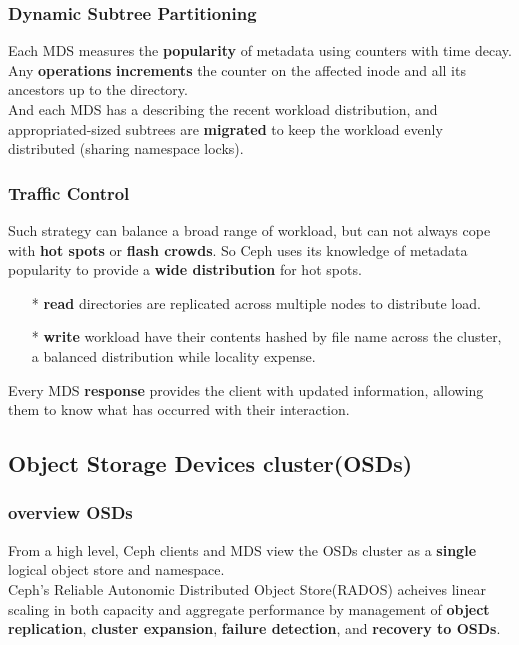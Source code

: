 \documentclass[cjk,slidestop,mathserif]{beamer}
\begin{document}
\begin{CJK}{UTF8}{gkai}
\begin{frame}
\end{frame}

\begin{frame}
 \frametitle{Dynamic Subtree Partitioning}
 \vspace{12pt}
 Each MDS measures the \textbf{popularity} of metadata using counters with time decay. Any \textbf{operations} 
 \textbf{increments} the counter on the affected inode and all its ancestors up to the directory. \\
 \vspace{6pt}
 And each MDS has a  describing the recent workload distribution, and appropriated-sized 
 subtrees are \textbf{migrated} to keep 
 the workload evenly distributed (sharing namespace locks).
\end{frame}

\begin{frame}
 \frametitle{Traffic Control}
 \vspace{6pt}
 Such strategy can balance a broad range of workload, but can not always cope with \textbf{hot spots} or \textbf{flash crowds}. 
 So Ceph uses its knowledge of metadata popularity to provide a \textbf{wide distribution} for hot spots.\\
 \vspace{4pt}
 \begin{itemize}
  \item[*] \textbf{read} directories are replicated across multiple nodes to distribute load.
  \item[*] \textbf{write} workload have their contents hashed by file name across the cluster, a balanced distribution while locality expense.
 \end{itemize}
  Every MDS \textbf{response} provides the client with updated information, allowing them to know what has occurred with their interaction.
\end{frame}

\subsection{Object Storage Devices cluster(OSDs)}
\begin{frame}
 \frametitle{overview OSDs}
 \vspace{18pt}
 From a high level, Ceph clients and MDS view the OSDs cluster as a \textbf{single} logical object store and namespace. \\
 \vspace{6pt}
 Ceph's Reliable Autonomic Distributed Object Store(RADOS) acheives linear scaling in both capacity and aggregate performance 
 by management of \textbf{object replication}, \textbf{cluster expansion}, \textbf{failure detection}, and \textbf{recovery to OSDs}.
\end{frame}


\end{CJK}
\end{document}
